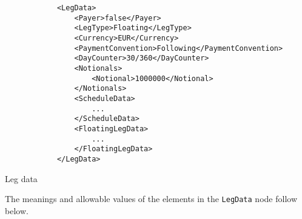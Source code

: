 \begin{listing}[H]
\begin{verbatim}
            <LegData>
                <Payer>false</Payer>
                <LegType>Floating</LegType>
                <Currency>EUR</Currency>
                <PaymentConvention>Following</PaymentConvention>
                <DayCounter>30/360</DayCounter>
                <Notionals>
                    <Notional>1000000</Notional>
                </Notionals>
                <ScheduleData>
                	...
                </ScheduleData>
                <FloatingLegData>
                	...
                </FloatingLegData>
            </LegData>
\end{verbatim}
\caption{Leg data}
\label{lst:leg_data}
\end{listing}

The meanings and allowable values of the elements in the \lstinline!LegData! node follow below.

